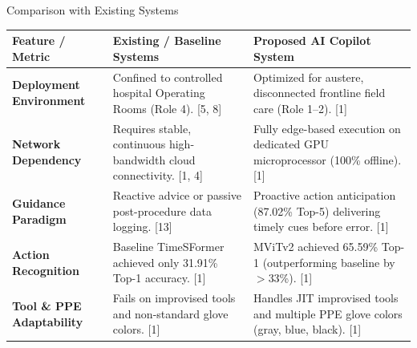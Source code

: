 \documentclass[aspectratio=169, 10pt]{beamer}
\begin{document}
\begin{frame}{Comparison with Existing Systems}
    \vspace{0.15cm}
    \scriptsize
    \setlength{\tabcolsep}{4pt}
    \renewcommand{\arraystretch}{1.18}
    \begin{tabularx}{\textwidth}{|>{\raggedright\arraybackslash}p{2.6cm}|>{\raggedright\arraybackslash}X|>{\raggedright\arraybackslash}X|}
        \hline
        \textbf{Feature / Metric} & \textbf{Existing / Baseline Systems} & \textbf{Proposed AI Copilot System} \\
        \hline
        \textbf{Deployment Environment} & Confined to controlled hospital Operating Rooms (Role 4). [5, 8] & Optimized for austere, disconnected frontline field care (Role 1--2). [1] \\
        \hline
        \textbf{Network Dependency} & Requires stable, continuous high-bandwidth cloud connectivity. [1, 4] & Fully edge-based execution on dedicated GPU microprocessor (100\% offline). [1] \\
        \hline
        \textbf{Guidance Paradigm} & Reactive advice or passive post-procedure data logging. [13] & Proactive action anticipation (87.02\% Top-5) delivering timely cues before error. [1] \\
        \hline
        \textbf{Action Recognition} & Baseline TimeSFormer achieved only 31.91\% Top-1 accuracy. [1] & MViTv2 achieved 65.59\% Top-1 (outperforming baseline by $>$33\%). [1] \\
        \hline
        \textbf{Tool \& PPE Adaptability} & Fails on improvised tools and non-standard glove colors. [1] & Handles JIT improvised tools and multiple PPE glove colors (gray, blue, black). [1] \\
        \hline
    \end{tabularx}
\end{frame}
\end{document}
